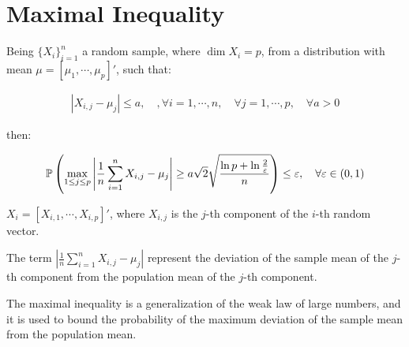 \section{Maximal Inequality}

Being $\{X_i\}_{i=1}^n$ a random sample, where $\dim{X_i} = p$, from a distribution with mean $\mu = [\mu_1, \cdots, \mu_p]'$, such that:

\begin{align*}
|X_{i,j} - \mu_{j}| \leq a, \quad, \forall i = 1, \cdots, n, \quad \forall j = 1, \cdots, p, \quad \forall a > 0
\end{align*}

then: 

\begin{align*}
\mathbb{P}\left(
    \max_{1 \leq j \leq p}{
        \left|
            \frac{1}{n} \sum_{i=1}^{n} X_{i,j} - \mu_{j}
        \right|
    }
    \geq
    a \sqrt{2} \sqrt{
        \dfrac{\ln p + \ln \frac{2}{\varepsilon}}{n}
    }
\right) \leq \varepsilon, \quad \forall \varepsilon \in (0, 1)
\end{align*}

$X_i = [X_{i,1}, \cdots, X_{i,p}]'$, where $X_{i,j}$ is the $j$-th component of the $i$-th random vector.

The term 
$
\left|
        \frac{1}{n} \sum_{i=1}^{n} X_{i,j} - \mu_{j}
\right|
$
represent the deviation of the sample mean of the $j$-th component from the population mean of the $j$-th component.

The maximal inequality is a generalization of the weak law of large numbers, and it is used to bound the probability of the maximum deviation of the sample mean from the population mean.


